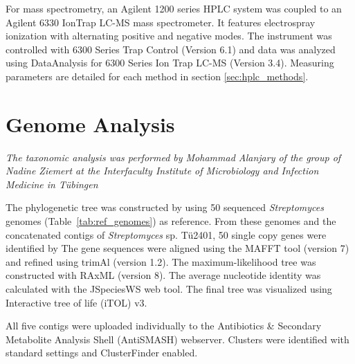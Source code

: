 	For mass spectrometry, an Agilent 1200 series HPLC system was coupled to an Agilent 6330 IonTrap LC-MS mass spectrometer. It features electrospray ionization with alternating positive and negative modes. The instrument was controlled with 6300 Series Trap Control (Version 6.1) and data was analyzed using DataAnalysis for 6300 Series Ion Trap LC-MS (Version 3.4). Measuring parameters are detailed for each method in section \ref{sec:hplc_methods}.


\section{Genome Analysis} %
\label{sec:genome_analysis}

	\emph{The taxonomic analysis was performed by Mohammad Alanjary of the group of Nadine Ziemert at the Interfaculty Institute of Microbiology and Infection Medicine in Tübingen}

	The phylogenetic tree was constructed by using 50 sequenced \textit{Streptomyces} genomes (Table~\ref{tab:ref_genomes}) as reference. From these genomes and the concatenated contigs of \textit{Streptomyces} sp. Tü2401, 50 single copy genes were identified by
	The gene sequences were aligned using the MAFFT tool (version 7) and refined using trimAl (version 1.2).\autocite{Katoh2017,Kuraku2013,Capella-Gutierrez2009} The maximum-likelihood tree was constructed with RAxML (version 8).\autocite{Stamatakis2014} The average nucleotide identity was calculated with the JSpeciesWS web tool.\autocite{Richter2017} The final tree was visualized using Interactive tree of life (iTOL) v3.\autocite{Letunic2016}

	All five contigs were uploaded individually to the Antibiotics \& Secondary Metabolite Analysis Shell (AntiSMASH) webserver.  \autocite{Weber2015,Blin2013,Medema2011} Clusters were identified with standard settings and ClusterFinder enabled.



